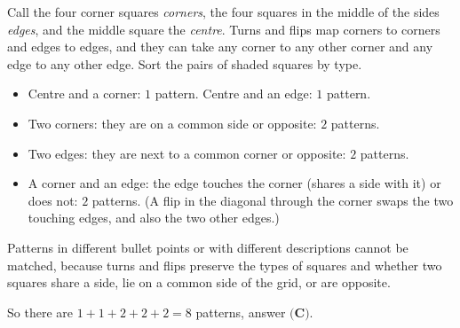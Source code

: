 Call the four corner squares \emph{corners}, the four squares in the middle of the sides \emph{edges}, and the middle square the \emph{centre}. Turns and flips map corners to corners and edges to edges, and they can take any corner to any other corner and any edge to any other edge. Sort the pairs of shaded squares by type.
\begin{itemize}
\item Centre and a corner: $1$ pattern. Centre and an edge: $1$ pattern.
\item Two corners: they are on a common side or opposite: $2$ patterns.
\item Two edges: they are next to a common corner or opposite: $2$ patterns.
\item A corner and an edge: the edge touches the corner (shares a side with it) or does not: $2$ patterns. (A flip in the diagonal through the corner swaps the two touching edges, and also the two other edges.)
\end{itemize}
Patterns in different bullet points or with different descriptions cannot be matched, because turns and flips preserve the types of squares and whether two squares share a side, lie on a common side of the grid, or are opposite.


So there are $1+1+2+2+2=8$ patterns, answer $\boxed{\textbf{(C)}}$.
